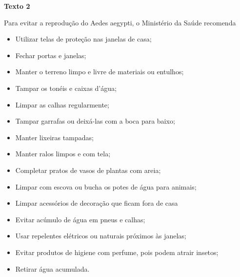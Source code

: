\textbf{Texto 2}

\begin{myquote}

Para evitar a reprodução do Aedes aegypti, o Ministério da Saúde recomenda 

\begin{itemize}
  
  \item Utilizar telas de proteção nas janelas de casa;
  
  \item Fechar portas e janelas;
  
  \item Manter o terreno limpo e livre de materiais ou entulhos;
  
  \item Tampar os tonéis e caixas d'água;
  
  \item Limpar as calhas regularmente;
  
  \item Tampar garrafas ou deixá-las com a boca para baixo;
  
  \item Manter lixeiras tampadas;
  
  \item Manter ralos limpos e com tela;
  
  \item Completar pratos de vasos de plantas com areia;
  
  \item Limpar com escova ou bucha os potes de água para animais;
  
  \item Limpar acessórios de decoração que ficam fora de casa 

  \item Evitar acúmulo de água em pneus e calhas;
  
  \item Usar repelentes elétricos ou naturais próximos às janelas;
  
  \item Evitar produtos de higiene com perfume, pois podem atrair insetos;
  
  \item Retirar água acumulada.
 
\end{itemize}


\end{myquote}


